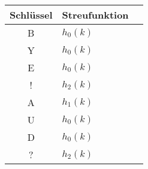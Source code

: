 \documentclass{lehramt-informatik-aufgabe}
\begin{document}
\begin{enumerate}
\begin{liAntwort}
\begin{center}
\begin{tabular}{|c||l|l|}
\hline
Schlüssel & Streufunktion\\
\hline
B & $h_0(k)$ \\
Y & $h_0(k)$ \\
E & $h_0(k)$ \\
! & $h_2(k)$ \\
A & $h_1(k)$ \\
U & $h_0(k)$ \\
D & $h_0(k)$ \\
? & $h_2(k)$ \\
\hline
\end{tabular}
\end{center}
\end{liAntwort}

\end{enumerate}
\end{document}
